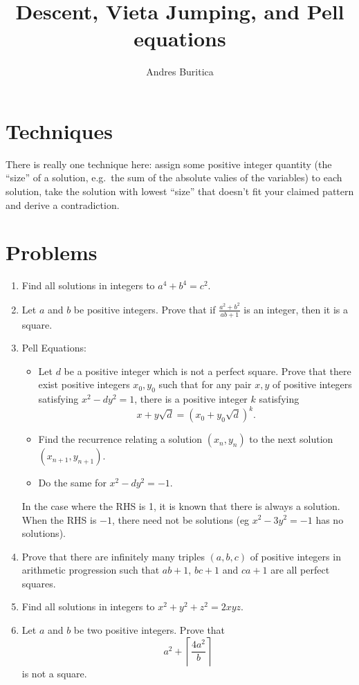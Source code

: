 \documentclass{article}
\title{Descent, Vieta Jumping, and Pell equations}
\author{Andres Buritica}
\date{}
\begin{document}
\maketitle
\section{Techniques}
  There is really one technique here: assign some positive integer quantity
  (the ``size'' of a solution, e.g.\ the sum of the absolute valies of the
  variables) to each solution, take the solution with lowest
  ``size'' that doesn't fit your claimed pattern and derive a contradiction.
\section{Problems}
\begin{enumerate}
  \item Find all solutions in integers to $a^4+b^4=c^2$.
  \item Let $a$ and $b$ be positive integers.
    Prove that if \(\frac{a^2+b^2}{ab+1}\) is an integer, then it is a square.
  \item Pell Equations:
    \begin{itemize}
      \item Let $d$ be a positive integer which is not a perfect square. Prove that
      there exist positive integers $x_0,y_0$ such that for any pair $x,y$ of
      positive integers satisfying $x^2-dy^2=1$, there is a positive integer $k$
      satisfying
      \[x+y\sqrt d=(x_0+y_0\sqrt d)^k.\]
      \item Find the recurrence relating a solution $(x_n,y_n)$ to the next
        solution $(x_{n+1},y_{n+1})$.
      \item Do the same for $x^2-dy^2=-1$.
    \end{itemize}
    In the case where the RHS is 1, it is known that there is always a solution.
    When the RHS
    is $-1$, there need not be solutions (eg $x^2-3y^2=-1$ has no solutions).
  \item Prove that there are infinitely many triples $(a,b,c)$ of positive
    integers in arithmetic progression
    such that $ab+1$, $bc+1$ and $ca+1$ are all perfect squares.
  \item Find all solutions in integers to $x^2+y^2+z^2=2xyz$.
  \item Let $a$ and $b$ be two positive integers. Prove that
    \[a^2+\left\lceil\frac{4a^2}b\right\rceil\] is not a square.
\end{enumerate}
\newpage
\end{document}
